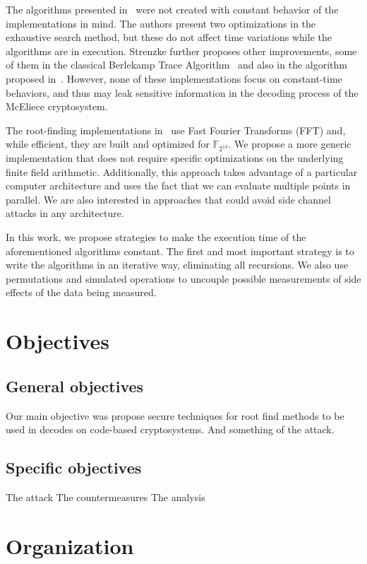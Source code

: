 The algorithms presented in~\cite{strenzke2012fast} were not created with constant behavior of the implementations in mind. The authors present two optimizations in the exhaustive search method, but these do not affect time variations while the algorithms are in execution. Strenzke further proposes other improvements, some of them in the classical Berlekamp Trace Algorithm~\cite{berlekamp1967solution} and also in the algorithm proposed in~\cite{fedorenko2002finding}. However, none of these implementations focus on constant-time behaviors, and thus may leak sensitive information in the decoding process of the McEliece cryptosystem.

The root-finding implementations in~\cite{chou2017mcbits, bernstein2013mcbits} use Fast Fourier Transforms (FFT) and, while efficient, they are built and optimized for $\mathbb{F}_{2^{13}}$. We propose a more generic implementation that does not require specific optimizations on the underlying finite field arithmetic. Additionally, this approach takes advantage of a particular computer architecture and uses the fact that we can evaluate multiple points in parallel. We are also interested in approaches that could avoid side channel attacks in any architecture. 

In this work, we propose strategies to make the execution time of the aforementioned algorithms constant. The first and most important strategy is to write the algorithms in an iterative way, eliminating all recursions. We also use permutations and simulated operations to uncouple possible measurements of side effects of the data being measured.

\section{Objectives}

\subsection{General objectives}
Our main objective was propose secure techniques for root find methods to be used in decodes on code-based cryptosystems. And something of the attack.
\subsection{Specific objectives}
The attack
The countermeasures
The analysis
\section{Organization}



